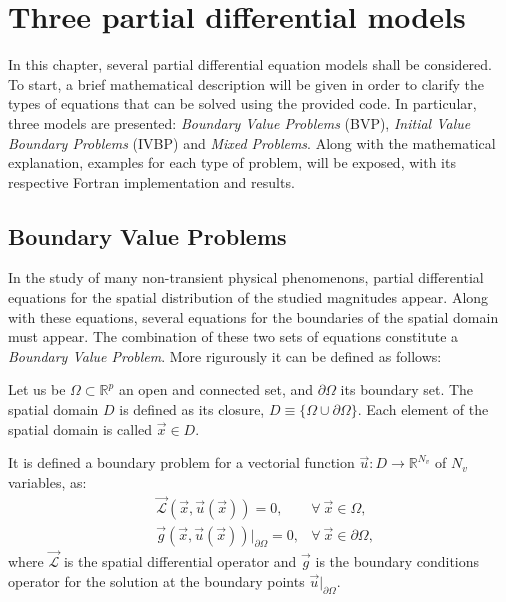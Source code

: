      
       \chapter{Three partial differential models   }\label{PDES}
       
       In this chapter, several partial differential equation models shall be considered. To start, a brief mathematical description will be given in order to clarify the types of equations that can be solved using the provided code. In particular, three models are presented: \textit{Boundary Value Problems} (BVP), \textit{Initial Value Boundary Problems} (IVBP) and \textit{Mixed Problems}. Along with the mathematical explanation, examples for each type of problem, will be exposed, with its respective Fortran implementation and results.
       
       \section{Boundary Value Problems}\label{BVP}
	   In the study of many non-transient physical phenomenons, partial differential equations for the spatial distribution of the studied magnitudes appear. Along with these equations, several equations for the boundaries of the spatial domain must appear. The combination of these two sets of equations constitute a \textit{Boundary Value Problem}. More rigurously it can be defined as follows:
	    
       Let us be $\Omega \subset \mathbb{ R}^p$ an open and connected set, and $\partial \Omega$ its boundary set. The spatial domain $D$ is defined as its closure, $D \equiv \{\Omega \cup \partial \Omega\}$. Each element of the spatial domain is called  $\vec{x} \in D $.

       It is defined a boundary problem for a vectorial function $\vec{u}: D \rightarrow \mathbb{R}^{N_v}$ of $N_v$ variables, as:
       \begin{eqnarray}
       	&\vec{\mathcal{L}} (\vec{x},\vec{u}(\vec{x})) = 0, &  \forall \ \vec{x} \in \Omega,\\ 
       	&\vec{g} (\vec{x},\vec{u}(\vec{x}))\big\rvert_{\partial \Omega}=0 , & \forall \  \vec{x} \in \partial \Omega, 
       \end{eqnarray}\label{BVPeq}
       where $\vec{\mathcal{L}}$ is the spatial differential operator and $\vec{g}$ is the boundary conditions operator for the solution at the boundary points $\vec{u} \big\rvert_{\partial \Omega}$. 
       
